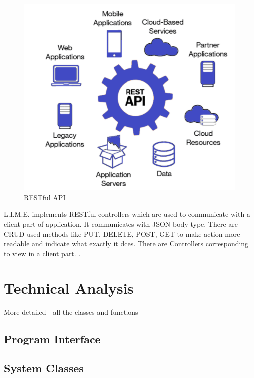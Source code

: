 \documentclass[a4paper,11pt,twoside]{report}
\theoremstyle{definition}
\begin{document}
\begin{figure}[h!]

\begin{center}

\includegraphics[width=\textwidth]{rest}

\end{center}
\caption{RESTful API}
\end{figure}
 
L.I.M.E. implements RESTful controllers which are used to communicate with a client part of application. It communicates with JSON body type. There are CRUD used methods like PUT, DELETE, POST, GET to make action more readable and indicate what exactly it does. There are Controllers corresponding to view in a client part. .




\chapter{Technical Analysis}

More detailed - all the classes and functions



\section{Program Interface}


\section{System Classes}
\end{document}
